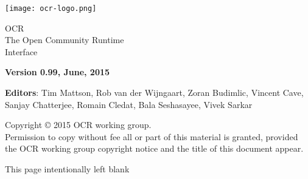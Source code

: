 
\begin{titlepage}
  \begin{flushleft}
    \hspace{-6em} \texttt{[image: ocr-logo.png]}
  \end{flushleft}

  \begin{adjustwidth}{-0.75in}{0in}
    \begin{center}
      \Huge
      \textsf{OCR\\The Open Community Runtime \\Interface}

      \vspace{0.5in}\textsf{ }\vspace{-0.7in}
      \normalsize
      \vspace{1.0in}
      \textbf{Version 0.99, June, 2015}
      \vspace{1.0in}

\textbf{Editors}: Tim Mattson, Rob van der Wijngaart, Zoran Budimlic,
Vincent Cave, Sanjay Chatterjee, Romain Cledat, Bala Seshasayee,
Vivek Sarkar
    \end{center}
  \end{adjustwidth}
  \vspace{2.0in}

  \begin{adjustwidth}{0pt}{1em}\setlength{\parskip}{0.25\baselineskip}%
Copyright © 2015 OCR working group.\\
Permission to copy without fee all or part of this material is granted,
provided the OCR working group copyright notice and
the title of this document appear.
  \end{adjustwidth}
\end{titlepage}


\clearpage
\thispagestyle{empty}
\phantom{a}
This page intentionally left blank
\vfill
